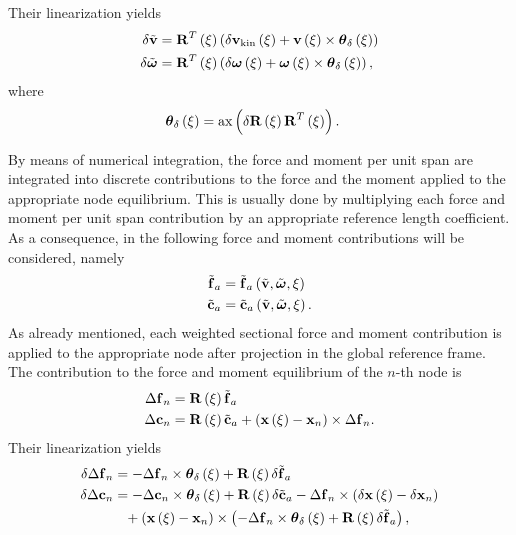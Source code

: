 Their linearization yields
\begin{subequations}
\begin{align}
	\delta\tilde{\bm{\mathbf{v}}}
	&=
	\bm{\mathbf{R}}^T\left( \xi \right) \left( 
		\delta\bm{\mathbf{v}}_{\text{kin}}\left( \xi \right)
		+ \bm{\mathbf{v}}\left( \xi \right) \times \bm{\mathbf{\theta}}_{\delta}\left( \xi \right)
	 \right)
	\\
	\delta\tilde{\bm{\mathbf{\omega}}}
	&=
	\bm{\mathbf{R}}^T\left( \xi \right) \left( 
		\delta\bm{\mathbf{\omega}}\left( \xi \right)
		+ \bm{\mathbf{\omega}}\left( \xi \right) \times \bm{\mathbf{\theta}}_{\delta}\left( \xi \right)
	 \right)
	,
\end{align}
\end{subequations}
where
\begin{align}
	\bm{\mathbf{\theta}}_{\delta}\left( \xi \right)
	&=
	\text{ax}\left( \delta\bm{\mathbf{R}}\left( \xi \right) \bm{\mathbf{R}}^T\left( \xi \right) \right)
	.
\end{align}

By means of numerical integration, the force and moment per unit span
are integrated into discrete contributions to the force and the moment
applied to the appropriate node equilibrium.
This is usually done by multiplying each force and moment per unit span
contribution by an appropriate reference length coefficient.
As a consequence, in the following force and moment contributions
will be considered, namely
\begin{subequations}
\begin{align}
	\tilde{\bm{\mathbf{f}}}_a
	&=
	\tilde{\bm{\mathbf{f}}}_a\left( \tilde{\bm{\mathbf{v}}}, \tilde{\bm{\mathbf{\omega}}}, \xi \right)
	\\
	\tilde{\bm{\mathbf{c}}}_a
	&=
	\tilde{\bm{\mathbf{c}}}_a\left( \tilde{\bm{\mathbf{v}}}, \tilde{\bm{\mathbf{\omega}}}, \xi \right)
	.
\end{align}
\end{subequations}
As already mentioned, each weighted sectional force and moment contribution
is applied to the appropriate node after projection in the global reference
frame.
The contribution to the force and moment equilibrium of the $n$-th node is
\begin{subequations}
	\label{eq:aero:fm-contrib}
\begin{align}
	\Delta\bm{\mathbf{f}}_n
	&=
	\bm{\mathbf{R}}\left( \xi \right) \tilde{\bm{\mathbf{f}}}_a
	\label{eq:aero:fm-contrib:f}
	\\
	\Delta\bm{\mathbf{c}}_n
	&=
	\bm{\mathbf{R}}\left( \xi \right) \tilde{\bm{\mathbf{c}}}_a
	+ \left( \bm{\mathbf{x}}\left( \xi \right) - \bm{\mathbf{x}}_n \right) \times \Delta\bm{\mathbf{f}}_n
	\label{eq:aero:fm-contrib:m}
	.
\end{align}
\end{subequations}
Their linearization yields
\begin{subequations}
\begin{align}
	\delta\Delta\bm{\mathbf{f}}_n
	&=
	- \Delta\bm{\mathbf{f}}_n \times \bm{\mathbf{\theta}}_{\delta}\left( \xi \right)
	+ \bm{\mathbf{R}}\left( \xi \right) \delta\tilde{\bm{\mathbf{f}}}_a
	\\
	\delta\Delta\bm{\mathbf{c}}_n
	&=
	- \Delta\bm{\mathbf{c}}_n \times \bm{\mathbf{\theta}}_{\delta}\left( \xi \right)
	+ \bm{\mathbf{R}}\left( \xi \right) \delta\tilde{\bm{\mathbf{c}}}_a
	- \Delta\bm{\mathbf{f}}_n \times \left( 
		\delta\bm{\mathbf{x}}\left( \xi \right)
		- \delta\bm{\mathbf{x}}_n
	 \right)
	\nonumber \\
	&\hphantom{= } \mbox{}
	+ \left( 
		\bm{\mathbf{x}}\left( \xi \right)
		- \bm{\mathbf{x}}_n
	 \right) \times \left( 
		- \Delta\bm{\mathbf{f}}_n \times \bm{\mathbf{\theta}}_{\delta}\left( \xi \right)
		+ \bm{\mathbf{R}}\left( \xi \right) \delta\tilde{\bm{\mathbf{f}}}_a
	 \right)
	,
\end{align}
\end{subequations}
